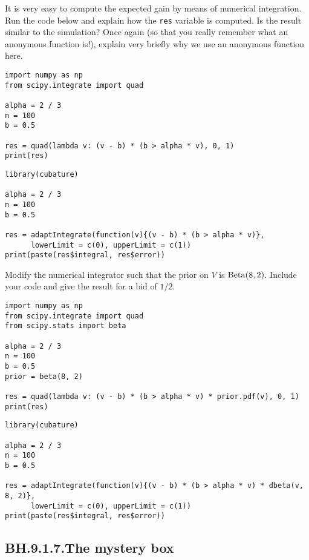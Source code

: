 \begin{exercise}
It is very easy to compute the expected gain by means of numerical integration. Run the code below and explain how the \verb|res| variable is computed.  Is the result similar to the simulation? Once again (so that you really remember what an anonymous function is!), explain very briefly why we use an anonymous function here.
\begin{verbatim}
import numpy as np
from scipy.integrate import quad

alpha = 2 / 3
n = 100
b = 0.5

res = quad(lambda v: (v - b) * (b > alpha * v), 0, 1)
print(res)
\end{verbatim}

\begin{verbatim}
library(cubature) 

alpha = 2 / 3
n = 100
b = 0.5

res = adaptIntegrate(function(v){(v - b) * (b > alpha * v)}, 
	  lowerLimit = c(0), upperLimit = c(1))
print(paste(res$integral, res$error))
\end{verbatim}
\end{exercise}

\begin{exercise}
Modify the numerical integrator  such that the prior on $V$ is $\mathrm{Beta}(8, 2)$. Include your code and give the result for a bid of $1/2$.
\begin{solution}
\begin{verbatim}
import numpy as np
from scipy.integrate import quad
from scipy.stats import beta

alpha = 2 / 3
n = 100
b = 0.5
prior = beta(8, 2)

res = quad(lambda v: (v - b) * (b > alpha * v) * prior.pdf(v), 0, 1)
print(res)
\end{verbatim}

\begin{verbatim}
library(cubature) 

alpha = 2 / 3
n = 100
b = 0.5

res = adaptIntegrate(function(v){(v - b) * (b > alpha * v) * dbeta(v, 8, 2)}, 
	  lowerLimit = c(0), upperLimit = c(1))
print(paste(res$integral, res$error))

\end{verbatim}
\end{solution}
\end{exercise}

\subsection{BH.9.1.7.The mystery box}


